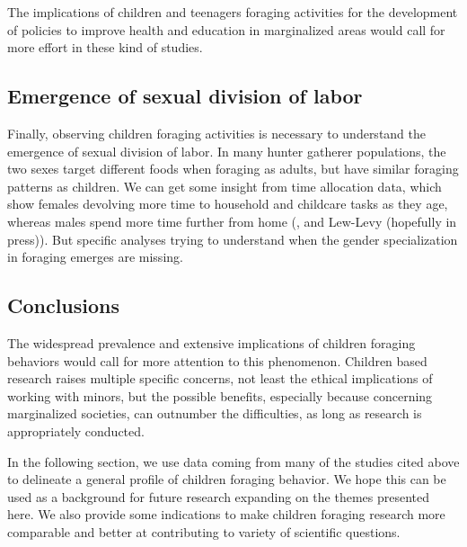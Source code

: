 The implications of children and teenagers foraging activities for the development of policies to improve health and education in marginalized areas would call for more effort in these kind of studies.

\subsection{Emergence of sexual division of labor}
Finally, observing children foraging activities is necessary to understand the emergence of sexual division of labor. In many hunter gatherer populations, the two sexes target different foods when foraging as adults, but have similar foraging patterns as children. We can get some insight from time allocation data, which show females devolving more time to household and childcare tasks as they age, whereas males spend more time further from home (\cite{froehle_physical_2019}, and Lew-Levy (hopefully in press)). But specific analyses trying to understand when the gender specialization in foraging emerges are missing.

\subsection{Conclusions}
The widespread prevalence and extensive implications of children foraging behaviors would call for more attention to this phenomenon. Children based research raises multiple specific concerns, not least the ethical implications of working with minors, but the possible benefits, especially because concerning marginalized societies, can outnumber the difficulties, as long as research is appropriately conducted.

In the following section, we use data coming from many of the studies cited above to delineate a general profile of children foraging behavior. We hope this can be used as a background for future research expanding on the themes presented here. We also provide some indications to make children foraging research more comparable and better at contributing to variety of scientific questions.


